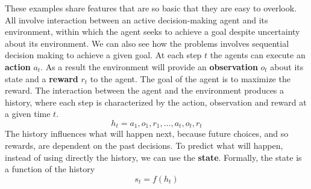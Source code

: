 \documentclass[main.tex]{subfiles}
\begin{document}
These examples share features that are so basic that they are easy to overlook. All involve interaction between an active decision-making agent and its environment, within which the agent seeks to achieve a goal despite uncertainty about its environment. We can also see how the problems involves sequential decision making to achieve a given goal.
At each step $t$ the agents can execute an \textbf{action} $a_t$. As a result the environment will provide an \textbf{observation} $o_t$ about its state and a \textbf{reward} $r_t$ to the agent. The goal of the agent is to maximize the reward. The interaction between the agent and the environment produces a history, where each step is characterized by the action, observation and reward at a given time $t$.
\begin{equation*}
    h_t = a_1,o_1,r_1, \dots, a_t,o_t,r_t
\end{equation*}
The history influences what will happen next, because future choices, and so rewards, are dependent on the past decisions. To predict what will happen, instead of using directly the history, we can use the \textbf{state}. Formally, the state is a function of the history
\begin{equation*}
    s_t = f(h_t)
\end{equation*}
\end{document}
